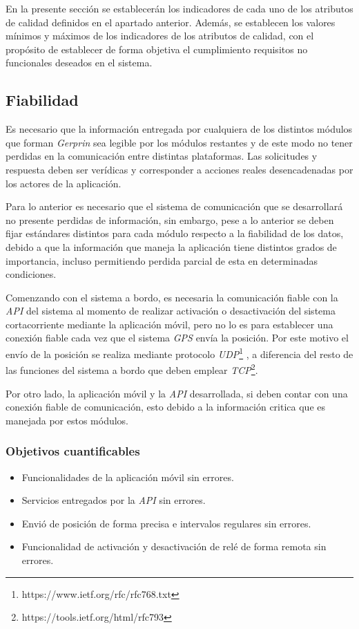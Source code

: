 En la presente sección se establecerán los indicadores de cada uno de los atributos de calidad definidos en el apartado anterior. Además, se establecen los valores mínimos y máximos de los indicadores de los atributos de calidad, con el propósito de establecer de forma objetiva el cumplimiento requisitos no funcionales deseados en el sistema.

\subsection{Fiabilidad}

Es necesario que la información entregada por cualquiera de los distintos módulos que forman \emph{Gerprin} sea legible por los módulos restantes y de este modo no tener perdidas en la comunicación entre distintas plataformas. Las solicitudes y respuesta deben ser verídicas y corresponder a acciones reales desencadenadas por los actores de la aplicación.

Para lo anterior es necesario que el sistema de comunicación que se desarrollará no presente perdidas de información, sin embargo, pese a lo anterior se deben fijar estándares distintos para cada módulo respecto a la fiabilidad de los datos, debido a que la información que maneja la aplicación tiene distintos grados de importancia, incluso permitiendo perdida parcial de esta en determinadas condiciones.

Comenzando con el sistema a bordo, es necesaria la comunicación fiable con la \emph{API} del sistema al momento de realizar activación o desactivación del sistema cortacorriente mediante la aplicación móvil, pero no lo es para establecer una conexión fiable cada vez que el sistema \emph{GPS} envía la posición. Por este motivo el envío de la posición se realiza mediante protocolo \emph{UDP}\footnote{https://www.ietf.org/rfc/rfc768.txt} , a diferencia del resto de las funciones del sistema a bordo que deben emplear \emph{TCP}\footnote{https://tools.ietf.org/html/rfc793}.

Por otro lado, la aplicación móvil y la \emph{API} desarrollada, si deben contar con una conexión fiable de comunicación, esto debido a la información critica que es manejada por estos módulos.

\subsubsection{Objetivos cuantificables}

\begin{itemize}
	\item
	Funcionalidades de la aplicación móvil sin errores.
	\item
	Servicios entregados por la \emph{API} sin errores.
	\item
	Envió de posición de forma precisa e intervalos regulares sin errores.
	\item
	Funcionalidad de activación y desactivación de relé de forma remota sin errores.
\end{itemize}

